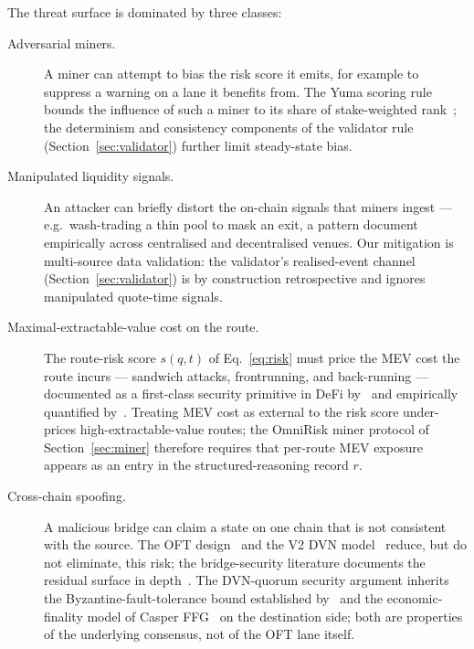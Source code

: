 \documentclass[11pt,a4paper]{article}
\begin{document}
The threat surface is dominated by three classes:
\begin{description}
  \item[Adversarial miners.] A miner can attempt to bias the risk score it emits, for
        example to suppress a warning on a lane it benefits from. The Yuma scoring rule
        bounds the influence of such a miner to its share of stake-weighted
        rank~\cite{steeves2022incentivizing}; the determinism and consistency
        components of the validator rule (Section~\ref{sec:validator}) further limit
        steady-state bias.
  \item[Manipulated liquidity signals.] An attacker can briefly distort the on-chain
        signals that miners ingest --- e.g.\ wash-trading a thin pool to mask an exit,
        a pattern \cite{cong2022crypto} document empirically across centralised and
        decentralised venues. Our mitigation is multi-source data validation: the
        validator's realised-event channel (Section~\ref{sec:validator}) is by
        construction retrospective and ignores manipulated quote-time signals.
  \item[Maximal-extractable-value cost on the route.] The route-risk score $s(q,t)$
        of Eq.~\eqref{eq:risk} must price the MEV cost the route incurs ---
        sandwich attacks, frontrunning, and back-running --- documented as a
        first-class security primitive in DeFi by~\cite{daian2020flash} and
        empirically quantified by~\cite{qin2022quantifying}. Treating MEV cost as
        external to the risk score under-prices high-extractable-value routes; the
        OmniRisk miner protocol of Section~\ref{sec:miner} therefore requires that
        per-route MEV exposure appears as an entry in the structured-reasoning
        record $r$.
  \item[Cross-chain spoofing.] A malicious bridge can claim a state on one chain that
        is not consistent with the source. The OFT design~\cite{layerzero2024oft}
        and the V2 DVN model~\cite{zarick2024layerzero} reduce, but do not eliminate,
        this risk; the bridge-security literature documents the residual surface in
        depth~\cite{zhang2023sok,augusto2024sok,wu2025safeguarding,belchior2021survey}.
        The DVN-quorum security argument inherits the Byzantine-fault-tolerance bound
        established by~\cite{castro1999practical} and the economic-finality model of
        Casper FFG~\cite{buterin2017casper} on the destination side; both are
        properties of the underlying consensus, not of the OFT lane itself.
\end{description}
\end{document}
